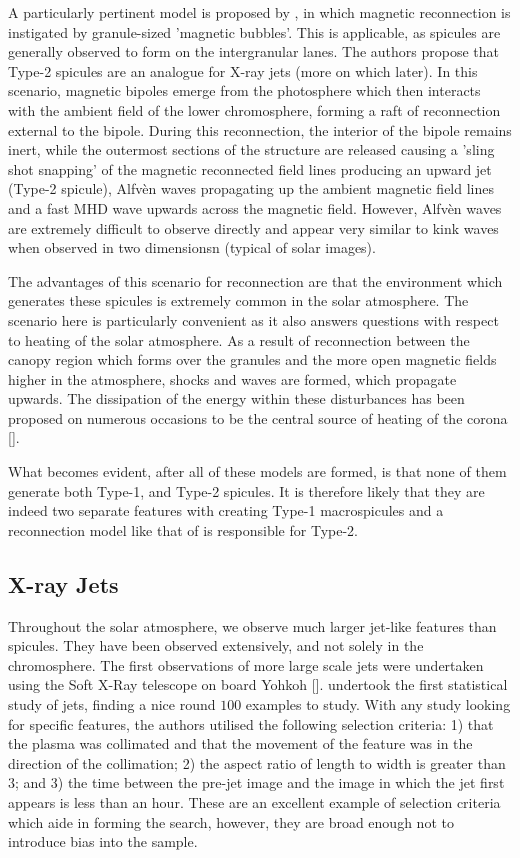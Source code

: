 A particularly pertinent model is proposed by \cite{Moore2011spic_recon}, in which magnetic reconnection is instigated by granule-sized 'magnetic bubbles'.
This is applicable, as spicules are generally observed to form on the intergranular lanes.
The authors propose that Type-2 spicules are an analogue for X-ray jets (more on which later).
In this scenario, magnetic bipoles emerge from the photosphere which then interacts with the ambient field of the lower chromosphere, forming a raft of reconnection external to the bipole.
During this reconnection, the interior of the bipole remains inert, while the outermost sections of the structure are released causing a 'sling shot snapping' of the magnetic reconnected field lines producing an upward jet (Type-2 spicule), Alfv{\`e}n waves propagating up the ambient magnetic field lines and a fast MHD wave upwards across the magnetic field.
However, Alfv{\`e}n waves are extremely difficult to observe directly and appear very similar to kink waves when observed in two dimensionsn (typical of solar images). 

The advantages of this scenario for reconnection are that the environment which generates these spicules is extremely common in the solar atmosphere.
The scenario here is particularly convenient as it also answers questions with respect to heating of the solar atmosphere.
As a result of reconnection between the canopy region which forms over the granules and the more open magnetic fields higher in the atmosphere, shocks and waves are formed, which propagate upwards.
The dissipation of the energy within these disturbances has been proposed on numerous occasions to be the central source of heating of the corona [\cite{Klimchuk2012, Kudoh1999, Athay2000}]. 

What becomes evident, after all of these models are formed, is that none of them generate both Type-1, and Type-2 spicules.
It is therefore likely that they are indeed two separate features with \cite{DePointeu2004} creating Type-1 macrospicules and a reconnection model like that of \cite{Moore2011spic_recon} is responsible for Type-2.

\subsection{X-ray Jets}
Throughout the solar atmosphere, we observe much larger jet-like features than spicules.
They have been observed extensively, and not solely in the chromosphere.
The first observations of more large scale jets were undertaken using the Soft X-Ray telescope on board Yohkoh [\cite{Tsuneta1991}].
\cite{Shimojo1996} undertook the first statistical study of jets, finding a nice round $100$ examples to study.
With any study looking for specific features, the authors utilised the following selection criteria: 1) that the plasma was collimated and that the movement of the feature was in the direction of the collimation; 2) the aspect ratio of length to width is greater than $3$; and 3) the time between the pre-jet image and the image in which the jet first appears is less than an hour.
These are an excellent example of selection criteria which aide in forming the search, however, they are broad enough not to introduce bias into the sample.

